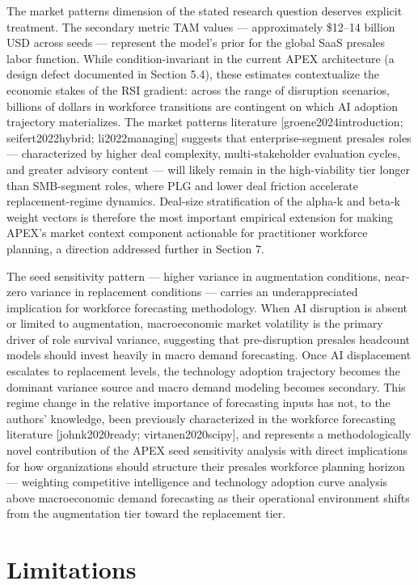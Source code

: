 \documentclass[10pt, conference]{IEEEtran}
\begin{document}
The market patterns dimension of the stated research question deserves explicit treatment. The secondary metric TAM values --- approximately \$12--14 billion USD across seeds --- represent the model's prior for the global SaaS presales labor function. While condition-invariant in the current APEX architecture (a design defect documented in Section 5.4), these estimates contextualize the economic stakes of the RSI gradient: across the range of disruption scenarios, billions of dollars in workforce transitions are contingent on which AI adoption trajectory materializes. The market patterns literature [groene2024introduction; seifert2022hybrid; li2022managing] suggests that enterprise-segment presales roles --- characterized by higher deal complexity, multi-stakeholder evaluation cycles, and greater advisory content --- will likely remain in the high-viability tier longer than SMB-segment roles, where PLG and lower deal friction accelerate replacement-regime dynamics. Deal-size stratification of the alpha-k and beta-k weight vectors is therefore the most important empirical extension for making APEX's market context component actionable for practitioner workforce planning, a direction addressed further in Section 7.

The seed sensitivity pattern --- higher variance in augmentation conditions, near-zero variance in replacement conditions --- carries an underappreciated implication for workforce forecasting methodology. When AI disruption is absent or limited to augmentation, macroeconomic market volatility is the primary driver of role survival variance, suggesting that pre-disruption presales headcount models should invest heavily in macro demand forecasting. Once AI displacement escalates to replacement levels, the technology adoption trajectory becomes the dominant variance source and macro demand modeling becomes secondary. This regime change in the relative importance of forecasting inputs has not, to the authors' knowledge, been previously characterized in the workforce forecasting literature [johnk2020ready; virtanen2020scipy], and represents a methodologically novel contribution of the APEX seed sensitivity analysis with direct implications for how organizations should structure their presales workforce planning horizon --- weighting competitive intelligence and technology adoption curve analysis above macroeconomic demand forecasting as their operational environment shifts from the augmentation tier toward the replacement tier.

\section{Limitations}
\end{document}
